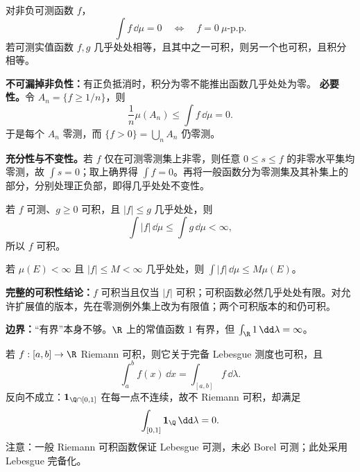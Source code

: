 对非负可测函数 $f$，
\[
\int f\,\dd\mu=0
\quad\Longleftrightarrow\quad f=0\ \mu\text{-p.p.}
\]
若可测实值函数 $f,g$ 几乎处处相等，且其中之一可积，则另一个也可积，且积分相等。

\textbf{不可漏掉非负性：}有正负抵消时，积分为零不能推出函数几乎处处为零。
\textbf{必要性。}令 $A_n=\{f\ge1/n\}$，则
\[
\frac1n\mu(A_n)\le\int f\,\dd\mu=0.
\]
于是每个 $A_n$ 零测，而 $\{f>0\}=\bigcup_n A_n$ 仍零测。

\textbf{充分性与不变性。}若 $f$ 仅在可测零测集上非零，则任意 $0\le s\le f$ 的非零水平集均零测，故 $\int s=0$；取上确界得 $\int f=0$。再将一般函数分为零测集及其补集上的部分，分别处理正负部，即得几乎处处不变性。

若 $f$ 可测、$g\ge0$ 可积，且 $|f|\le g$ 几乎处处，则
\[
\int|f|\,\dd\mu\le\int g\,\dd\mu<\infty,
\]
所以 $f$ 可积。

若 $\mu(E)<\infty$ 且 $|f|\le M<\infty$ 几乎处处，则 $\int|f|\,\dd\mu\le M\mu(E)$。

\textbf{完整的可积性结论：}$f$ 可积当且仅当 $|f|$ 可积；可积函数必然几乎处处有限。对允许扩展值的版本，先在零测例外集上改为有限值；两个可积版本的和仍可积。

\textbf{边界：}“有界”本身不够。$\R$ 上的常值函数 $1$ 有界，但 $\int_{\R}1\,\dd\lambda=\infty$。

若 $f:[a,b]\to\R$ Riemann 可积，则它关于完备 Lebesgue 测度也可积，且
\[
\int_a^b f(x)\,\dd x=\int_{[a,b]}f\,\dd\lambda.
\]
反向不成立：$\mathbf1_{\Q\cap[0,1]}$ 在每一点不连续，故不 Riemann 可积，却满足
\[
\int_{[0,1]}\mathbf1_{\Q}\,\dd\lambda=0.
\]
注意：一般 Riemann 可积函数保证 Lebesgue 可测，未必 Borel 可测；此处采用 Lebesgue 完备化。

